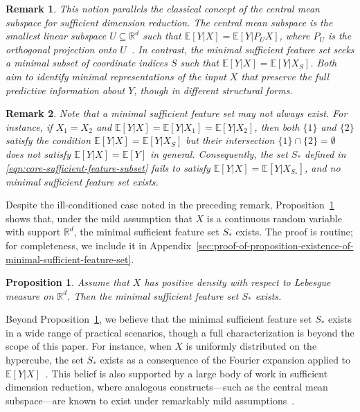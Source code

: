 \documentclass[sn-mathphys-num]{sn-jnl}%
\numberwithin{equation}{section}
\newcommand{\R}{\mathbb{R}}
\newcommand{\E}{\mathbb{E}}
\theoremstyle{thmstyleone}%
\newtheorem{proposition}[theorem]{Proposition}%
\theoremstyle{thmstyletwo}%
\newtheorem{remark}{Remark}%
\theoremstyle{thmstylethree}%
\begin{document}
\vspace{0.5em}
\begin{remark}
\emph{
This notion parallels the classical concept of the \emph{central mean subspace} for sufficient dimension reduction. The central mean subspace is the smallest linear subspace $U \subseteq \mathbb{R}^d$ such that $\E[Y|X] = \E[Y|P_U X]$, where $P_U$ is the orthogonal projection onto $U$~\cite{CookLi02, Cook09}. In contrast, the minimal sufficient feature set seeks a minimal subset of coordinate indices $S$ such that $\E[Y|X] = \E[Y|X_S]$. Both aim to identify minimal representations of the input $X$ that preserve the full predictive information about $Y$, though in different structural forms.
}
\end{remark} 

\vspace{0.5em}
\begin{remark}
\emph{
Note that a minimal sufficient feature set may not always exist. For instance, if $X_1 = X_2$ and $\E[Y|X] = \E[Y|X_1] = \E[Y|X_2]$, then both $\{1\}$ and $\{2\}$ satisfy the condition $\E[Y|X] = \E[Y|X_S]$ but their intersection $\{1\} \cap \{2\} = \emptyset$ does not satisfy $\E[Y|X] = \E[Y]$ in general. Consequently, the set $S_*$ defined in \eqref{eqn:core-sufficient-feature-subset} fails to satisfy $\E[Y|X] = \E[Y|X_{S_*}]$, and no minimal sufficient feature set exists.
}
\end{remark}

\vspace{0.5em} 
Despite the ill-conditioned case noted in the preceding remark, Proposition~\ref{proposition:existence-of-minimal-sufficient-feature-set} shows that, under the mild assumption that $X$ is a continuous random variable with support $\mathbb{R}^d$, the minimal sufficient feature set $S_*$ exists. The proof is routine; for completeness, we include it in Appendix~\ref{sec:proof-of-proposition-existence-of-minimal-sufficient-feature-set}.


\vspace{0.5em}
\begin{proposition} 
\label{proposition:existence-of-minimal-sufficient-feature-set}
Assume that $X$ has positive density with respect to Lebesgue measure on $\R^d$. 
Then the minimal sufficient feature set $S_*$ exists. 
\end{proposition}


\vspace{0.5em}
Beyond Proposition~\ref{proposition:existence-of-minimal-sufficient-feature-set}, we believe that
the minimal sufficient feature set $S_*$ exists in a wide range of practical scenarios, though a full characterization is beyond the scope of this paper. For instance, when $X$ is uniformly distributed on the hypercube, the set $S_*$ exists as a consequence of the Fourier expansion applied to $\E[Y | X]$~\cite{ODonnell14}. This belief is also supported by a large body of work in sufficient dimension reduction, where analogous constructs---such as the central mean subspace---are known to exist under remarkably mild assumptions~\cite{Cook09}.
\end{document}
